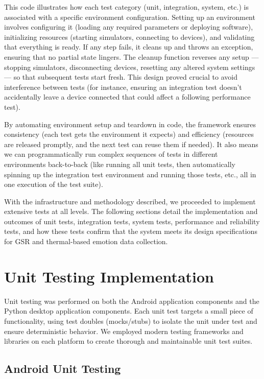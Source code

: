 \documentclass[11pt,a4paper]{report}
\begin{document}
This code illustrates how each test category (unit, integration, system,
etc.) is associated with a specific environment configuration. Setting
up an environment involves configuring it (loading any required
parameters or deploying software), initializing resources (starting
simulators, connecting to devices), and validating that everything is
ready. If any step fails, it cleans up and throws an exception, ensuring
that no partial state lingers. The cleanup function reverses any setup
--- stopping simulators, disconnecting devices, resetting any altered
system settings --- so that subsequent tests start fresh. This design
proved crucial to avoid interference between tests (for instance,
ensuring an integration test doesn't accidentally leave a device
connected that could affect a following performance test).

By automating environment setup and teardown in code, the framework
ensures consistency (each test gets the environment it expects) and
efficiency (resources are released promptly, and the next test can reuse
them if needed). It also means we can programmatically run complex
sequences of tests in different environments back-to-back (like running
all unit tests, then automatically spinning up the integration test
environment and running those tests, etc., all in one execution of the
test suite).

With the infrastructure and methodology described, we proceeded to
implement extensive tests at all levels. The following sections detail
the implementation and outcomes of unit tests, integration tests, system
tests, performance and reliability tests, and how these tests confirm
that the system meets its design specifications for GSR and
thermal-based emotion data collection.

\section{Unit Testing Implementation}

Unit testing was performed on both the Android application components
and the Python desktop application components. Each unit test targets a
small piece of functionality, using test doubles (mocks/stubs) to
isolate the unit under test and ensure deterministic behavior. We
employed modern testing frameworks and libraries on each platform to
create thorough and maintainable unit test suites.

\subsection{Android Unit Testing}
\end{document}
